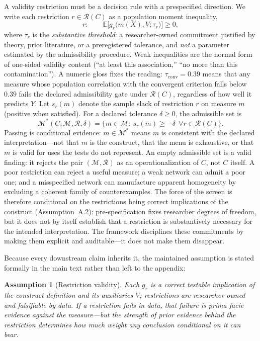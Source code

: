 \documentclass[10pt,letterpaper]{article}
\newtheorem{assumption}{Assumption}[section]
\newcommand{\M}{\ensuremath{\mathcal{M}}}
\newcommand{\E}{\mathbb{E}}
\newcommand{\Rset}{\mathcal{R}}
\begin{document}
A validity restriction must be a decision rule with a prespecified direction.
We write each restriction $r\in\Rset(C)$ as a population moment inequality,
\begin{equation}
r:\qquad \E\bigl[g_r\bigl(m(X),V;\tau_r\bigr)\bigr]\ge 0,
\label{eq:restriction}
\end{equation}
where $\tau_r$ is the \emph{substantive threshold}: a researcher-owned commitment justified by theory, prior literature, or a preregistered tolerance, and \emph{not} a parameter estimated by the admissibility procedure.
Weak inequalities are the normal form of one-sided validity content (``at least this association,'' ``no more than this contamination'').
A numeric gloss fixes the reading: $\tau_{\mathrm{conv}}=0.39$ means that any measure whose population correlation with the convergent criterion falls below $0.39$ fails the declared admissibility gate under $\Rset(C)$, regardless of how well it predicts $Y$.
Let $s_r(m)$ denote the sample slack of restriction $r$ on measure $m$ (positive when satisfied).
For a declared tolerance $\delta\ge 0$, the admissible set is
\begin{equation}
\M^*(C;\M,\Rset,\delta)=\bigl\{m\in\M:\ s_r(m)\ge-\delta\ \ \forall r\in\Rset(C)\bigr\}.
\label{eq:Mstar}
\end{equation}
Passing is conditional evidence: $m\in\M^*$ means $m$ is consistent with the declared interpretation---not that $m$ is the construct, that the menu is exhaustive, or that $m$ is valid for uses the tests do not represent.
An empty admissible set is a valid finding: it rejects the pair $(\M,\Rset)$ as an operationalization of $C$, not $C$ itself.
A poor restriction can reject a useful measure; a weak network can admit a poor one; and a misspecified network can manufacture apparent homogeneity by excluding a coherent family of counterexamples.
The force of the screen is therefore conditional on the restrictions being correct implications of the construct (Assumption~A.2): pre-specification fixes researcher degrees of freedom, but it does not by itself establish that a restriction is substantively necessary for the intended interpretation.
The framework disciplines these commitments by making them explicit and auditable---it does not make them disappear.

Because every downstream claim inherits it, the maintained assumption is stated formally in the main text rather than left to the appendix:
\begin{assumption}[Restriction validity]\label{ass:restriction}
Each $g_r$ is a correct testable implication of the construct definition and its auxiliaries $V$; restrictions are researcher-owned and falsifiable by data.
If a restriction fails in data, that failure is prima facie evidence against the measure---but the strength of prior evidence behind the restriction determines how much weight any conclusion conditional on it can bear.
\end{assumption}
\end{document}
